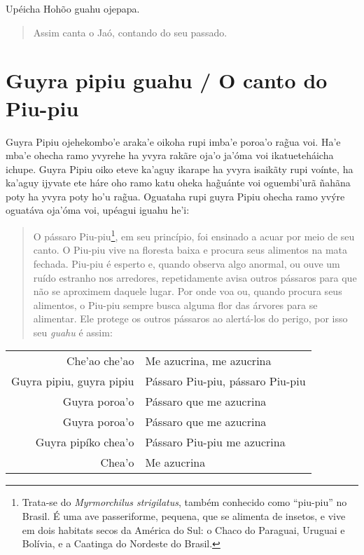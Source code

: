 



Upéicha Hohõo guahu ojepapa.

\begin{quote}
Assim canta o Jaó, contando do seu passado.
\end{quote}

\chapter{Guyra pipiu guahu / O canto do Piu-piu}

Guyra Pipiu ojehekombo'e araka'e oikoha rupi imba'e poroa'o rag̃ua voi.
Ha'e mba'e ohecha ramo yvyrehe ha yvyra rakãre oja'o ja'óma voi
ikatueteháicha ichupe. Guyra Pipiu oiko eteve ka'aguy ikarape ha yvyra
isaikãty rupi voínte, ha ka'aguy ijyvate ete háre oho ramo katu oheka
hag̃uánte voi oguembi'urã ñahãna poty ha yvyra poty ho'u rag̃ua. Oguataha
rupi guyra Pipiu ohecha ramo yvýre oguatáva oja'óma voi, upéagui iguahu
he'i:

\begin{quote}
O pássaro Piu-piu\footnote{Trata-se do \emph{Myrmorchilus strigilatus},
  também conhecido como ``piu-piu'' no Brasil. É uma ave passeriforme,
  pequena, que se alimenta de insetos, e vive em dois habitats secos da
  América do Sul: o Chaco do Paraguai, Uruguai e Bolívia, e a Caatinga
  do Nordeste do Brasil.}, em seu princípio, foi ensinado a acuar por
meio de seu canto. O Piu-piu vive na floresta baixa e procura seus
alimentos na mata fechada. Piu-piu é esperto e, quando observa algo
anormal, ou ouve um ruído estranho nos arredores, repetidamente avisa
outros pássaros para que não se aproximem daquele lugar. Por onde voa
ou, quando procura seus alimentos, o Piu-piu sempre busca alguma flor
das árvores para se alimentar. Ele protege os outros pássaros ao
alertá-los do perigo, por isso seu \emph{guahu} é assim:
\end{quote}


\begin{table}[]
\begin{tabular}{rl}
Che'ao che'ao          & Me azucrina, me azucrina           \\
Guyra pipiu, guyra pipiu          & Pássaro Piu-piu, pássaro Piu-piu           \\
Guyra poroa'o  		& Pássaro que me azucrina \\
Guyra poroa'o          & Pássaro que me azucrina           \\
Guyra pipíko chea'o          & Pássaro Piu-piu me azucrina           \\
Chea'o          & Me azucrina           \\
\end{tabular}
\end{table}

